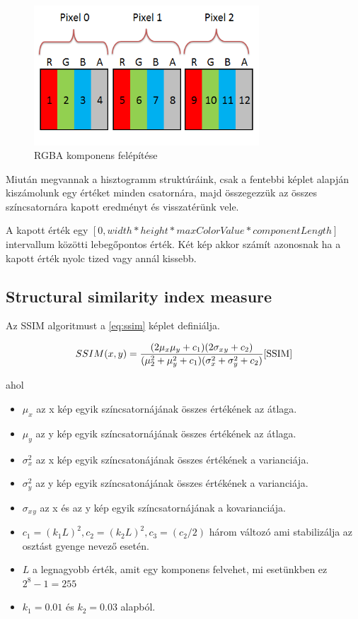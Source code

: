 \begin{figure}[hbt!]
    \centering
    \includegraphics[width=0.75\textwidth,height=0.75\textheight,keepaspectratio]
    {resources/color_channels.png}
    \caption{RGBA komponens felépítése\cite{RGB}}
    \label{fig:rgba}
\end{figure}

Miután megvannak a hisztogramm struktúráink, csak a fentebbi képlet alapján kiszámolunk egy értéket minden csatornára, majd összegezzük az összes színcsatornára kapott eredményt és visszatérünk vele. 

A kapott érték egy \([0,width * height * maxColorValue * componentLength]\) intervallum közötti lebegőpontos érték. Két kép akkor számít azonosnak ha a kapott érték nyolc tized vagy annál kissebb.

\subsection{Structural similarity index measure}

Az SSIM algoritmust a \ref{eq:ssim} képlet definiálja.

\begin{equation} \label{eq:ssim}
 SSIM(x,y) = \frac{(2\mu_x\mu_y + c_1)(2\sigma_x{}_y + c_2)}
                  {(\mu^2_2 + \mu^2_y + c_1)(\sigma^2_x + \sigma^2_y + c_2)}\cite{SSIM}
\end{equation}

ahol

\begin{itemize}
    \item \(\mu_x\) az x kép egyik színcsatornájának összes értékének az átlaga.
    \item \(\mu_y\) az y kép egyik színcsatornájának összes értékének az átlaga.
    \item \(\sigma^2_x\) az x kép egyik színcsatonájának összes értékének a varianciája.
    \item \(\sigma^2_y\) az y kép egyik színcsatonájának összes értékének a varianciája.
    \item \(\sigma_x{}_y\) az x és az y kép egyik színcsatornájának a kovarianciája.
    \item \(c_1=(k_1L)^2, c_2=(k_2L)^2, c_3=(c_2/2)\) három változó ami stabilizálja az osztást gyenge nevező esetén.
    \item \(L\) a legnagyobb érték, amit egy komponens felvehet, mi esetünkben ez \(2^8 - 1 = 255\)
    \item \(k_1 = 0.01\) és \(k_2 = 0.03\) alapból.
\end{itemize}

